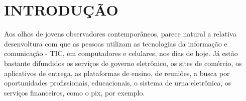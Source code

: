\documentclass[
12pt,		%
openright,	%
twoside,  %
a4paper,			%
chapter=TITLE,		%
english,			%
french,				%
spanish,			%
brazil				%
]{USPSC-classe/USPSC}
\begin{document}






%




\listoffigures*
\cleardoublepage

\listoftables*
\cleardoublepage

\listofquadro*
\cleardoublepage




\tableofcontents*
\cleardoublepage
\textual

\chapter[INTRODU\c{C}\~AO]{INTRODU\c{C}\~AO}\label{INTRODU\c{C}\~AO}
Aos olhos de jovens observadores contempor\^aneos, parece natural a relativa desenvoltura com que as pessoas utilizam  as tecnologias da informa\c{c}\~ao e comunica\c{c}\~ao - TIC, em computadores e celulares, nos dias de hoje. J\'a est\~ao bastante difundidos os servi\c{c}os de governo eletr\^onico, os sites de com\'ercio, os  aplicativos de entrega, as plataformas de ensino, de reuni\~oes, a busca por oportunidades profissionais, educacionais, o sistema de urna eletr\^onica, os servi\c{c}os financeiros, como o pix, por exemplo.
\end{document}
